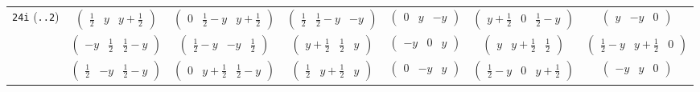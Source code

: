 \documentclass[fleqn,9pt,landscape]{jsarticle}
\begin{document}
\begin{center}
\begin{longtable}{ccccccc}
{\tt 24i} ({\tt ..2}) & $ \begin{pmatrix} \frac{1}{2} & y & y + \frac{1}{2} \end{pmatrix} $ & $ \begin{pmatrix} 0 & \frac{1}{2} - y & y + \frac{1}{2} \end{pmatrix} $ & $ \begin{pmatrix} \frac{1}{2} & \frac{1}{2} - y & - y \end{pmatrix} $ & $ \begin{pmatrix} 0 & y & - y \end{pmatrix} $ & $ \begin{pmatrix} y + \frac{1}{2} & 0 & \frac{1}{2} - y \end{pmatrix} $ & $ \begin{pmatrix} y & - y & 0 \end{pmatrix} $ \\
& $ \begin{pmatrix} - y & \frac{1}{2} & \frac{1}{2} - y \end{pmatrix} $ & $ \begin{pmatrix} \frac{1}{2} - y & - y & \frac{1}{2} \end{pmatrix} $ & $ \begin{pmatrix} y + \frac{1}{2} & \frac{1}{2} & y \end{pmatrix} $ & $ \begin{pmatrix} - y & 0 & y \end{pmatrix} $ & $ \begin{pmatrix} y & y + \frac{1}{2} & \frac{1}{2} \end{pmatrix} $ & $ \begin{pmatrix} \frac{1}{2} - y & y + \frac{1}{2} & 0 \end{pmatrix} $ \\
& $ \begin{pmatrix} \frac{1}{2} & - y & \frac{1}{2} - y \end{pmatrix} $ & $ \begin{pmatrix} 0 & y + \frac{1}{2} & \frac{1}{2} - y \end{pmatrix} $ & $ \begin{pmatrix} \frac{1}{2} & y + \frac{1}{2} & y \end{pmatrix} $ & $ \begin{pmatrix} 0 & - y & y \end{pmatrix} $ & $ \begin{pmatrix} \frac{1}{2} - y & 0 & y + \frac{1}{2} \end{pmatrix} $ & $ \begin{pmatrix} - y & y & 0 \end{pmatrix} $ \\

\end{longtable}
\end{center}
\end{document}
